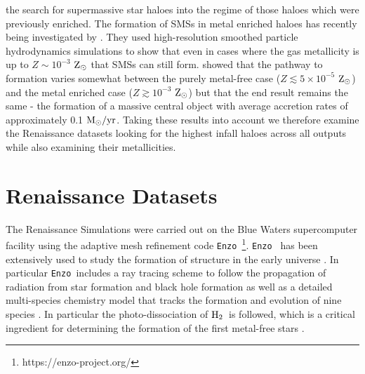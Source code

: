 \documentclass[graphics, twocolumn, usenatbib]{mn2e}
\newcommand{\enzo}{\texttt{Enzo~}}
\newcommand{\msolaryrc} {$\rm{M_{\odot}/yr}$}
\newcommand{\zsolar} {$\rm{Z_{\odot}}~$}
\newcommand{\zsolarc} {$\rm{Z_{\odot}}$}
\newcommand{\molH} {$\rm{H_2}$~}
\begin{document}
  the search for supermassive star haloes into the regime of those haloes which were previously
  enriched. The formation of SMSs in metal enriched haloes has recently being investigated by
  \cite{Chon_2020}. They used high-resolution smoothed particle hydrodynamics simulations to
  show that even in cases where the gas metallicity is up to $Z \sim 10^{-3}$ \zsolar that
  SMSs can still form. \cite{Chon_2020} showed that the pathway to formation varies
  somewhat between the purely metal-free case ($Z \lesssim 5 \times 10^{-5}$ \zsolarc) and the
  metal enriched
  case  ($Z \gtrsim 10^{-3}$ \zsolarc) but that the end result remains the same - the formation
  of a massive central object with average accretion rates of approximately 0.1 \msolaryrc.
  Taking these results into account we therefore examine the Renaissance datasets looking
  for the highest infall haloes across all outputs while also examining their metallicities. 

\section{Renaissance Datasets} \label{Sec:RenaissanceDatasets}
The Renaissance Simulations were carried out on the Blue Waters supercomputer facility using the
adaptive mesh refinement code \enzo\citep{Enzo_2014}\footnote{https://enzo-project.org/}. \enzo
has been extensively used to study the formation of structure in the early universe
\citep{Abel_2002, OShea_2005b, Turk_2012, Wise_2012b, Wise_2014, Regan_2015, Regan_2017}. In particular
\enzo includes a ray tracing scheme to follow the propagation of radiation from star formation and
black hole formation \citep{WiseAbel_2011} as well as a detailed multi-species chemistry model that
tracks the formation and evolution of nine species \citep{Anninos_1997, Abel_1997, Grackle}. In
particular the photo-dissociation of \molH is followed, which is a critical ingredient for
determining the formation of the first metal-free stars \citep{Abel_2000}. 
\end{document}

